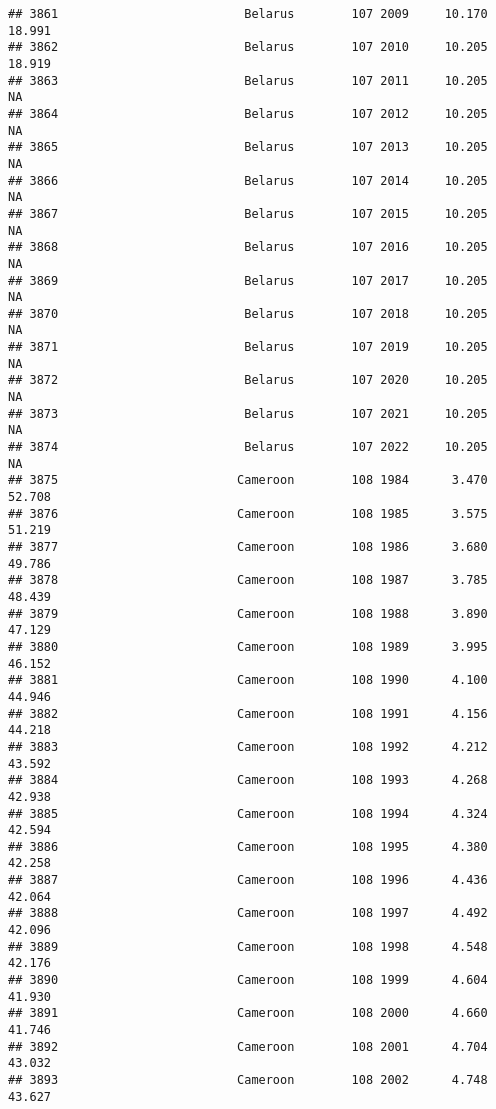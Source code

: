 \documentclass[
]{article}
\begin{document}
\begin{verbatim}
## 3861                          Belarus        107 2009     10.170     18.991
## 3862                          Belarus        107 2010     10.205     18.919
## 3863                          Belarus        107 2011     10.205         NA
## 3864                          Belarus        107 2012     10.205         NA
## 3865                          Belarus        107 2013     10.205         NA
## 3866                          Belarus        107 2014     10.205         NA
## 3867                          Belarus        107 2015     10.205         NA
## 3868                          Belarus        107 2016     10.205         NA
## 3869                          Belarus        107 2017     10.205         NA
## 3870                          Belarus        107 2018     10.205         NA
## 3871                          Belarus        107 2019     10.205         NA
## 3872                          Belarus        107 2020     10.205         NA
## 3873                          Belarus        107 2021     10.205         NA
## 3874                          Belarus        107 2022     10.205         NA
## 3875                         Cameroon        108 1984      3.470     52.708
## 3876                         Cameroon        108 1985      3.575     51.219
## 3877                         Cameroon        108 1986      3.680     49.786
## 3878                         Cameroon        108 1987      3.785     48.439
## 3879                         Cameroon        108 1988      3.890     47.129
## 3880                         Cameroon        108 1989      3.995     46.152
## 3881                         Cameroon        108 1990      4.100     44.946
## 3882                         Cameroon        108 1991      4.156     44.218
## 3883                         Cameroon        108 1992      4.212     43.592
## 3884                         Cameroon        108 1993      4.268     42.938
## 3885                         Cameroon        108 1994      4.324     42.594
## 3886                         Cameroon        108 1995      4.380     42.258
## 3887                         Cameroon        108 1996      4.436     42.064
## 3888                         Cameroon        108 1997      4.492     42.096
## 3889                         Cameroon        108 1998      4.548     42.176
## 3890                         Cameroon        108 1999      4.604     41.930
## 3891                         Cameroon        108 2000      4.660     41.746
## 3892                         Cameroon        108 2001      4.704     43.032
## 3893                         Cameroon        108 2002      4.748     43.627

\end{verbatim}
\end{document}

